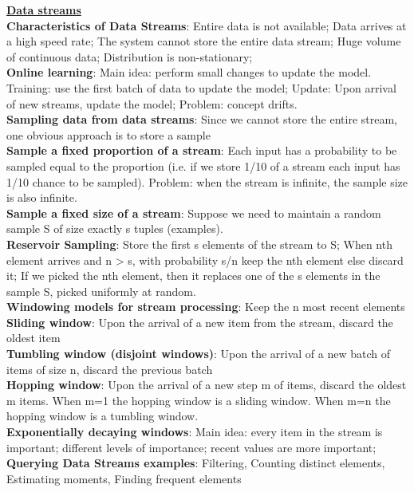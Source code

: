 \documentclass[a4paper,7pt,landscape]{extarticle}
\begin{document}
\begin{multicols}{3}
\begin{boxA}
\underline{\textbf{Data streams}}\\
\textbf{Characteristics of Data Streams}: Entire data is not available; Data arrives at a high speed rate; The system cannot store the entire data stream; Huge volume of continuous data; Distribution is non-stationary;\\
\textbf{Online learning}: Main idea: perform small changes to update the model. Training: use the first batch of data to update the model; Update: Upon arrival of new streams, update the model; Problem: concept drifts.\\
\textbf{Sampling data from data streams}: Since we cannot store the entire stream, one obvious approach is to store a sample\\
\textbf{Sample a fixed proportion of a stream}: Each input has a probability to be sampled equal to the proportion (i.e. if we store 1/10 of a stream each input has 1/10 chance to be sampled). Problem: when the stream is infinite, the sample size is also infinite.\\
\textbf{Sample a fixed size of a stream}: Suppose we need to maintain a random sample S of size exactly s tuples (examples).\\
\textbf{Reservoir Sampling}: Store the first s elements of the stream to S; When nth element arrives and n > s, with probability s/n keep the nth element else discard it; If we picked the nth element, then it replaces one of the s elements in the sample S, picked uniformly at random.\\
\textbf{Windowing models for stream processing}: Keep the n most recent elements\\
\textbf{Sliding window}: Upon the arrival of a new item from the stream, discard the oldest item\\
\textbf{Tumbling window (disjoint windows)}: Upon the arrival of a new batch of items of size n, discard the previous batch\\
\textbf{Hopping window}: Upon the arrival of a new step  m of items, discard the oldest m items. When m=1 the hopping window is a sliding window. When m=n the hopping window is a tumbling window.\\
\textbf{Exponentially decaying windows}: Main idea: every item in the stream is important; different levels of importance; recent values are more important;\\
\textbf{Querying Data Streams examples}: Filtering, Counting distinct elements, Estimating moments, Finding frequent elements\\

\end{boxA}
\end{multicols}
\end{document}
